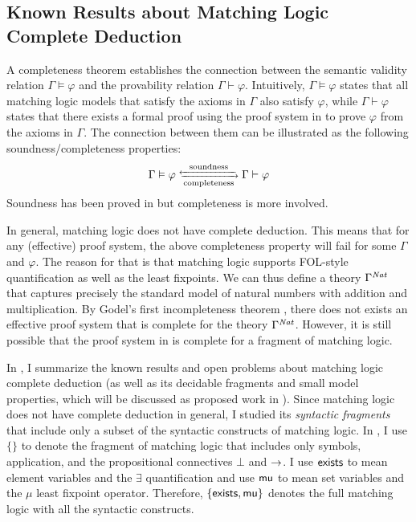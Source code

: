 \documentclass[11pt]{article}
\begin{document}
\subsection{Known Results about Matching Logic Complete Deduction}
\label{sec:known-complete}

A completeness theorem establishes the connection between the semantic validity 
relation $\Gamma \vDash \varphi$ and the provability relation $\Gamma \vdash 
\varphi$. 
Intuitively, $\Gamma \vDash \varphi$ states that all matching logic models
that satisfy the axioms in $\Gamma$ also satisfy $\varphi$,
while $\Gamma \vdash \varphi$ states that there exists a formal proof
using the proof system in  
to prove $\varphi$ from the axioms in $\Gamma$. 
The connection  between them can be illustrated as the following 
soundness/completeness 
properties:
$$
\Gamma \vDash \varphi \xleftrightarrows[\text{completeness}]{\text{soundness}}
\Gamma \vdash \varphi
$$
Soundness has been proved in \cite{CR19} but completeness is more involved. 

In general, matching logic does not have complete deduction. 
This means that for any (effective) proof system, the above completeness 
property will fail for some $\Gamma$ and $\varphi$. 
The reason for that is that matching logic supports FOL-style quantification 
as well as the least fixpoints. 
We can thus define a theory $\Gamma^{\mathit{Nat}}$ that captures precisely the 
standard model of natural numbers with addition and multiplication. 
By Godel's first incompleteness theorem \cite{Goe92}, 
there does not exists an effective proof system that is complete for
the theory $\Gamma^{\mathit{Nat}}$. 
However, it is still possible that the proof system in  is 
complete for a fragment of matching logic.

In , I summarize the known results and open problems about matching logic complete deduction (as well as its decidable fragments and small model properties, which will be discussed as proposed work in ).
Since matching logic does not have complete deduction in general, I studied its
\emph{syntactic fragments} that include only a subset of the syntactic constructs
of matching logic. 
In , I use $\{\}$ to denote the fragment of matching logic that includes only symbols, application, and the propositional connectives
$\bot$ and $\to$. 
I use $\mathsf{exists}$ to mean element variables and the $\exists$ quantification
and use $\mathsf{mu}$ to mean set variables and the $\mu$ least fixpoint operator.
Therefore, $\{\mathsf{exists},\mathsf{mu}\}$ denotes the full matching logic with all the syntactic constructs.
\end{document}
